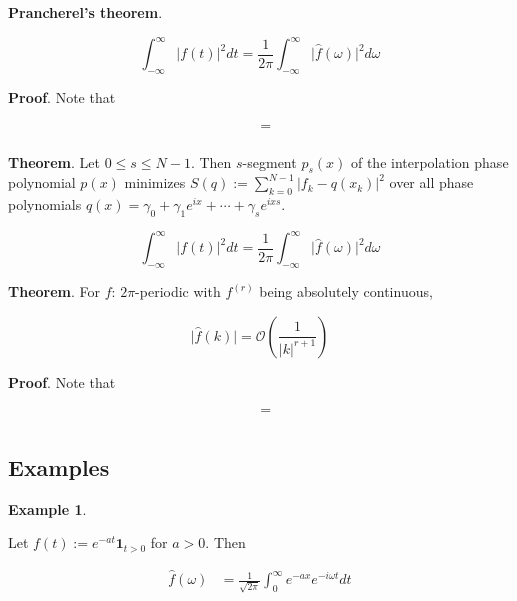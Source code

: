 \documentclass[12pt]{article}
\theoremstyle{nonumberbreak}
\begin{document}
\begin{theorem}
\textbf{Prancherel's theorem}. 

$$
\int_{-\infty}^\infty \vert f(t) \vert^2 dt = \frac{1}{2\pi} \int_{-\infty}^\infty \vert \hat{f}(\omega) \vert^2 d\omega
$$

\end{theorem}

\textbf{Proof}. Note that 

$$
\begin{aligned}
 &= \\[8pt]
\end{aligned}
$$




\begin{theorem}
\textbf{Theorem}. Let $0 \le s \le N-1$. Then $s$-segment $p_s(x)$ of the interpolation phase polynomial $p(x)$ minimizes $S(q) := \sum_{k=0}^{N-1} |f_k - q(x_k) |^2$ over all phase polynomials $q(x) = \gamma_0 + \gamma_1 e^{ix} + \cdots + \gamma_s e^{ixs}$. 

$$
\int_{-\infty}^\infty \vert f(t) \vert^2 dt = \frac{1}{2\pi} \int_{-\infty}^\infty \vert \hat{f}(\omega) \vert^2 d\omega
$$

\end{theorem}



\begin{theorem}
\textbf{Theorem}. For $f$: $2\pi$-periodic with $f^{(r)}$ being absolutely continuous,

$$
\vert \hat{f}(k) \vert = \mathcal{O} \left( \frac{1}{|k|^{r+1}} \right)
$$
\end{theorem}

\textbf{Proof}. Note that 

$$
\begin{aligned}
 &= \\[8pt]
\end{aligned}
$$





\subsection*{Examples}

\textbf{Example 1}.

Let $f(t) := e^{-at} \mathbf{1}_{t>0}$ for $a >0$. Then

$$
\begin{aligned}
\hat{f}(\omega) &= \frac{1}{\sqrt{2\pi}} \int_0^\infty e^{-ax} e^{-i \omega t} dt \\[8pt]
\end{aligned}
$$
\end{document}
